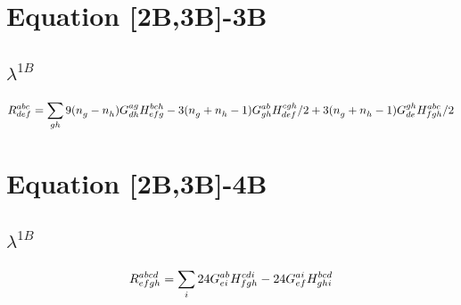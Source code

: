 \documentclass{scrartcl}
\begin{document}
\section{Equation [2B,3B]-3B}
\subsection{$\lambda^{1B}$}
\begin{dmath*}
R^{abc}_{def} = \sum_{gh} 9 \* (n^{}_{g}-n^{}_{h}) \* G^{ag}_{dh} \* H^{bch}_{efg}-3 \* (n^{}_{g}+n^{}_{h}-1) \* G^{ab}_{gh} \* H^{cgh}_{def}/2+3 \* (n^{}_{g}+n^{}_{h}-1) \* G^{gh}_{de} \* H^{abc}_{fgh}/2
\end{dmath*}
\section{Equation [2B,3B]-4B}
\subsection{$\lambda^{1B}$}
\begin{dmath*}
R^{abcd}_{efgh} = \sum_{i} 24 \* G^{ab}_{ei} \* H^{cdi}_{fgh}-24 \* G^{ai}_{ef} \* H^{bcd}_{ghi}
\end{dmath*}
\end{document}
